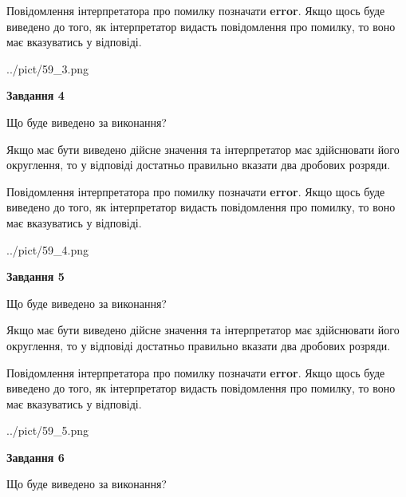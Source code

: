 \documentclass[12pt, ukrainian]{article}
\begin{document}
{\begin {Large}
Повідомлення інтерпретатора про помилку позначати \textbf{error}.
Якщо щось буде виведено до того, як інтерпретатор видасть повідомлення про помилку, 
то воно має вказуватись у відповіді. \par

\begin{center}
	{../pict/59_3.png}
\end{center}
\newpage

{\begin {center}\textbf{Завдання 4}\end {center}}\par
Що буде виведено за виконання? \par

Якщо має бути виведено дійсне значення та інтерпретатор має здійснювати його округлення, 
то у відповіді достатньо правильно вказати два дробових розряди.

Повідомлення інтерпретатора про помилку позначати \textbf{error}.
Якщо щось буде виведено до того, як інтерпретатор видасть повідомлення про помилку, 
то воно має вказуватись у відповіді. \par

\begin{center}
	{../pict/59_4.png}
\end{center}
\newpage

{\begin {center}\textbf{Завдання 5}\end {center}}\par
Що буде виведено за виконання? \par

Якщо має бути виведено дійсне значення та інтерпретатор має здійснювати його округлення, 
то у відповіді достатньо правильно вказати два дробових розряди.

Повідомлення інтерпретатора про помилку позначати \textbf{error}.
Якщо щось буде виведено до того, як інтерпретатор видасть повідомлення про помилку, 
то воно має вказуватись у відповіді. \par

\begin{center}
	{../pict/59_5.png}
\end{center}
\newpage

{\begin {center}\textbf{Завдання 6}\end {center}}\par
Що буде виведено за виконання? \par


\end{Large}}
\end{document}
